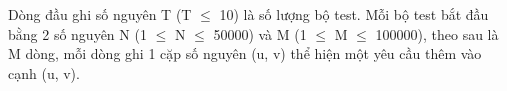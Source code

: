 Dòng đầu ghi số nguyên T (T  $\le$  10) là số lượng bộ test. Mỗi bộ test bắt đầu bằng 2 số nguyên N (1  $\le$  N  $\le$  50000) và M (1  $\le$  M  $\le$  100000), theo sau là M dòng, mỗi dòng ghi 1 cặp số nguyên (u, v) thể hiện một yêu cầu thêm vào cạnh (u, v).  

\